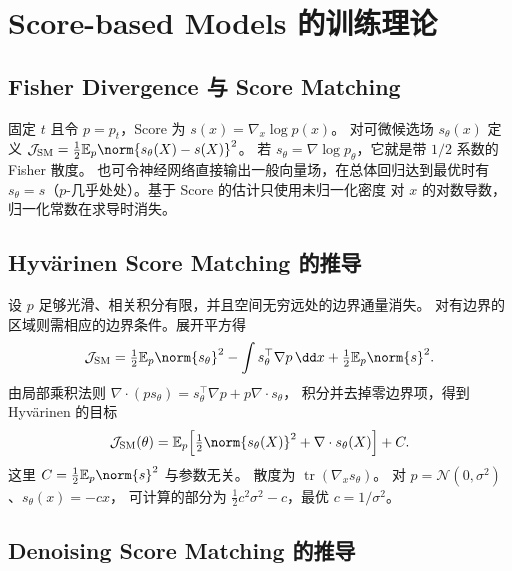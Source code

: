 \section{Score-based Models 的训练理论}
\label{sec:training-score}

\subsection{Fisher Divergence 与 Score Matching}

固定 \(t\) 且令 \(p=p_t\)，Score 为 \(s(x)=\nabla_x\log p(x)\)。
对可微候选场 \(s_\theta(x)\) 定义
\(\mathcal J_{\mathrm{SM}}=\tfrac12\mathbb E_{p}\norm{s_\theta(X)-s(X)}^2\)。
若 \(s_\theta=\nabla\log p_\theta\)，它就是带 \(1/2\) 系数的 Fisher 散度。
也可令神经网络直接输出一般向量场，在总体回归达到最优时有
\(s_\theta=s\)（\(p\)-几乎处处）。基于 Score 的估计只使用未归一化密度
对 \(x\) 的对数导数，归一化常数在求导时消失。

\subsection{Hyvärinen Score Matching 的推导\requiredderivation}

设 \(p\) 足够光滑、相关积分有限，并且空间无穷远处的边界通量消失。
对有边界的区域则需相应的边界条件。展开平方得
\[
  \mathcal J_{\mathrm{SM}}
  =\tfrac12\mathbb E_p\norm{s_\theta}^2
   -\int s_\theta^\top\nabla p\,\dd x
   +\tfrac12\mathbb E_p\norm{s}^2 .
\]
由局部乘积法则
\(\nabla\cdot(p s_\theta)=s_\theta^\top\nabla p+p\nabla\cdot s_\theta\)，
积分并去掉零边界项，得到 Hyvärinen 的目标 \cite{hyvarinen2005sm}
\begin{equation}
  \mathcal J_{\mathrm{SM}}(\theta)
   =\mathbb E_p\!\left[\tfrac12\norm{s_\theta(X)}^2
                       +\nabla\cdot s_\theta(X)\right]+C.
  \label{eq:training-implicit-sm}
\end{equation}
这里 \(C=\frac12\mathbb E_p\norm{s}^2\) 与参数无关。
散度为 \(\operatorname{tr}(\nabla_x s_\theta)\)。
对 \(p=\mathcal N(0,\sigma^2)\)、\(s_\theta(x)=-c x\)，
可计算的部分为 \(\frac12c^2\sigma^2-c\)，最优 \(c=1/\sigma^2\)。

\subsection{Denoising Score Matching 的推导\requiredderivation}
\label{subsec:training-dsm}

